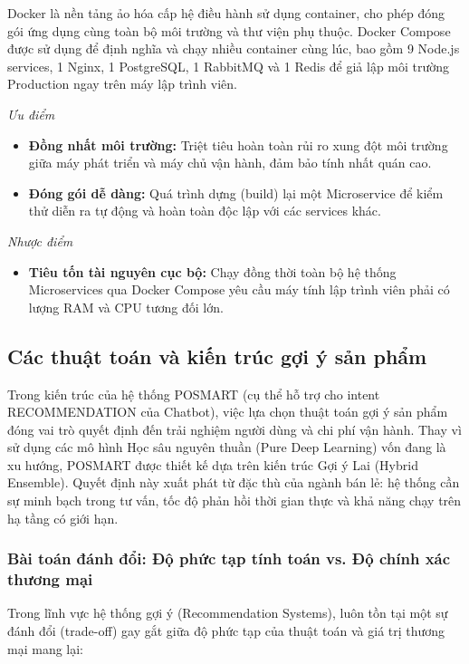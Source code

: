\documentclass[12pt,a4paper]{report}
\begin{document}
Docker là nền tảng ảo hóa cấp hệ điều hành sử dụng container, cho phép đóng gói ứng dụng cùng toàn bộ môi trường và thư viện phụ thuộc. Docker Compose được sử dụng để định nghĩa và chạy nhiều container cùng lúc, bao gồm 9 Node.js services, 1 Nginx, 1 PostgreSQL, 1 RabbitMQ và 1 Redis để giả lập môi trường Production ngay trên máy lập trình viên.

\textit{Ưu điểm}
\begin{itemize}
    \item \textbf{Đồng nhất môi trường:} Triệt tiêu hoàn toàn rủi ro xung đột môi trường giữa máy phát triển và máy chủ vận hành, đảm bảo tính nhất quán cao.
    \item \textbf{Đóng gói dễ dàng:} Quá trình dựng (build) lại một Microservice để kiểm thử diễn ra tự động và hoàn toàn độc lập với các services khác.
\end{itemize}

\textit{Nhược điểm}
\begin{itemize}
    \item \textbf{Tiêu tốn tài nguyên cục bộ:} Chạy đồng thời toàn bộ hệ thống Microservices qua Docker Compose yêu cầu máy tính lập trình viên phải có lượng RAM và CPU tương đối lớn.
\end{itemize}

\subsection{Các thuật toán và kiến trúc gợi ý sản phẩm}
 
Trong kiến trúc của hệ thống POSMART (cụ thể hỗ trợ cho intent RECOMMENDATION của Chatbot), việc lựa chọn thuật toán gợi ý sản phẩm đóng vai trò quyết định đến trải nghiệm người dùng và chi phí vận hành. Thay vì sử dụng các mô hình Học sâu nguyên thuần (Pure Deep Learning) vốn đang là xu hướng, POSMART được thiết kế dựa trên kiến trúc Gợi ý Lai (Hybrid Ensemble). Quyết định này xuất phát từ đặc thù của ngành bán lẻ: hệ thống cần sự minh bạch trong tư vấn, tốc độ phản hồi thời gian thực và khả năng chạy trên hạ tầng có giới hạn.
 
\subsubsection{Bài toán đánh đổi: Độ phức tạp tính toán vs. Độ chính xác thương mại}
 
Trong lĩnh vực hệ thống gợi ý (Recommendation Systems), luôn tồn tại một sự đánh đổi (trade-off) gay gắt giữa độ phức tạp của thuật toán và giá trị thương mại mang lại:
 
\end{document}
